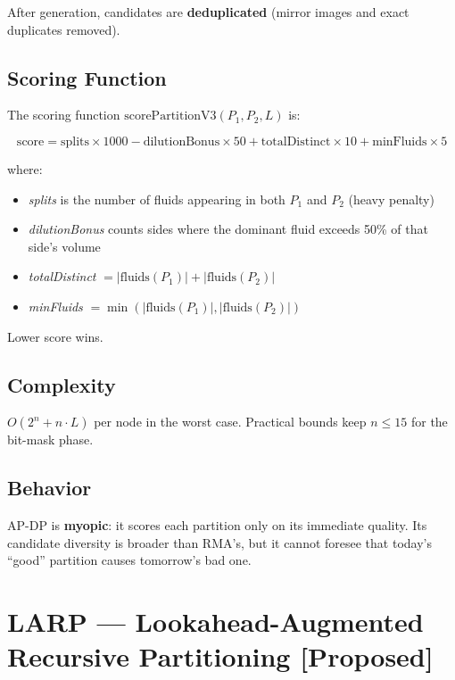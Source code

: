 After generation, candidates are \textbf{deduplicated} (mirror images and exact duplicates removed).

\subsection{Scoring Function}

The scoring function $\text{scorePartitionV3}(P_1, P_2, L)$ is:

\begin{equation}
\text{score} = \text{splits} \times 1000 - \text{dilutionBonus} \times 50 + \text{totalDistinct} \times 10 + \text{minFluids} \times 5
\end{equation}

where:
\begin{itemize}
    \item \textit{splits} is the number of fluids appearing in both $P_1$ and $P_2$ (heavy penalty)
    \item \textit{dilutionBonus} counts sides where the dominant fluid exceeds 50\% of that side's volume
    \item \textit{totalDistinct} $= |\text{fluids}(P_1)| + |\text{fluids}(P_2)|$
    \item \textit{minFluids} $= \min(|\text{fluids}(P_1)|, |\text{fluids}(P_2)|)$
\end{itemize}

Lower score wins.

\subsection{Complexity}

$O(2^n + n \cdot L)$ per node in the worst case. Practical bounds keep $n \leq 15$ for the bit-mask phase.

\subsection{Behavior}

AP-DP is \textbf{myopic}: it scores each partition only on its immediate quality. Its candidate diversity is broader than RMA's, but it cannot foresee that today's ``good'' partition causes tomorrow's bad one.

\section{LARP --- Lookahead-Augmented Recursive Partitioning [Proposed]}
\label{sec:larp_algo}

